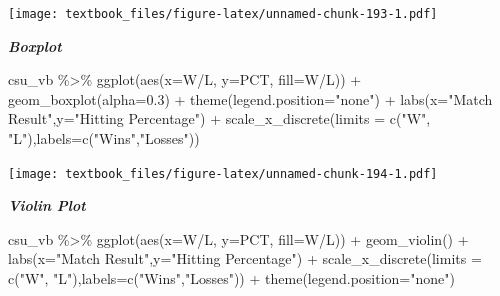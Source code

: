 \documentclass[
  11pt,
]{book}
\newenvironment{Shaded}{\begin{snugshade}}{\end{snugshade}}
\newcommand{\AttributeTok}[1]{\textcolor[rgb]{0.77,0.63,0.00}{#1}}
\newcommand{\FloatTok}[1]{\textcolor[rgb]{0.00,0.00,0.81}{#1}}
\newcommand{\FunctionTok}[1]{\textcolor[rgb]{0.00,0.00,0.00}{#1}}
\newcommand{\NormalTok}[1]{#1}
\newcommand{\SpecialCharTok}[1]{\textcolor[rgb]{0.00,0.00,0.00}{#1}}
\newcommand{\StringTok}[1]{\textcolor[rgb]{0.31,0.60,0.02}{#1}}
\theoremstyle{definition}
\theoremstyle{definition}
\theoremstyle{definition}
\theoremstyle{definition}
\theoremstyle{remark}
\begin{document}
\texttt{[image: textbook\_files/figure-latex/unnamed-chunk-193-1.pdf]}

\newpage

\textbf{\emph{Boxplot}}

\begin{Shaded}
\begin{Highlighting}[]
\NormalTok{csu\_vb }\SpecialCharTok{\%\textgreater{}\%} 
  \FunctionTok{ggplot}\NormalTok{(}\FunctionTok{aes}\NormalTok{(}\AttributeTok{x=}\StringTok{\textasciigrave{}}\AttributeTok{W/L}\StringTok{\textasciigrave{}}\NormalTok{, }\AttributeTok{y=}\NormalTok{PCT, }\AttributeTok{fill=}\StringTok{\textasciigrave{}}\AttributeTok{W/L}\StringTok{\textasciigrave{}}\NormalTok{)) }\SpecialCharTok{+} 
  \FunctionTok{geom\_boxplot}\NormalTok{(}\AttributeTok{alpha=}\FloatTok{0.3}\NormalTok{) }\SpecialCharTok{+}
  \FunctionTok{theme}\NormalTok{(}\AttributeTok{legend.position=}\StringTok{"none"}\NormalTok{) }\SpecialCharTok{+}
  \FunctionTok{labs}\NormalTok{(}\AttributeTok{x=}\StringTok{"Match Result"}\NormalTok{,}\AttributeTok{y=}\StringTok{"Hitting Percentage"}\NormalTok{) }\SpecialCharTok{+}
  \FunctionTok{scale\_x\_discrete}\NormalTok{(}\AttributeTok{limits =} \FunctionTok{c}\NormalTok{(}\StringTok{"W"}\NormalTok{, }\StringTok{"L"}\NormalTok{),}\AttributeTok{labels=}\FunctionTok{c}\NormalTok{(}\StringTok{"Wins"}\NormalTok{,}\StringTok{"Losses"}\NormalTok{))}
\end{Highlighting}
\end{Shaded}

\texttt{[image: textbook\_files/figure-latex/unnamed-chunk-194-1.pdf]}

\newpage

\textbf{\emph{Violin Plot}}

\begin{Shaded}
\begin{Highlighting}[]
\NormalTok{csu\_vb }\SpecialCharTok{\%\textgreater{}\%} \FunctionTok{ggplot}\NormalTok{(}\FunctionTok{aes}\NormalTok{(}\AttributeTok{x=}\StringTok{\textasciigrave{}}\AttributeTok{W/L}\StringTok{\textasciigrave{}}\NormalTok{, }\AttributeTok{y=}\NormalTok{PCT, }\AttributeTok{fill=}\StringTok{\textasciigrave{}}\AttributeTok{W/L}\StringTok{\textasciigrave{}}\NormalTok{)) }\SpecialCharTok{+} 
  \FunctionTok{geom\_violin}\NormalTok{() }\SpecialCharTok{+}
  \FunctionTok{labs}\NormalTok{(}\AttributeTok{x=}\StringTok{"Match Result"}\NormalTok{,}\AttributeTok{y=}\StringTok{"Hitting Percentage"}\NormalTok{) }\SpecialCharTok{+}
  \FunctionTok{scale\_x\_discrete}\NormalTok{(}\AttributeTok{limits =} \FunctionTok{c}\NormalTok{(}\StringTok{"W"}\NormalTok{, }\StringTok{"L"}\NormalTok{),}\AttributeTok{labels=}\FunctionTok{c}\NormalTok{(}\StringTok{"Wins"}\NormalTok{,}\StringTok{"Losses"}\NormalTok{)) }\SpecialCharTok{+} 
  \FunctionTok{theme}\NormalTok{(}\AttributeTok{legend.position=}\StringTok{"none"}\NormalTok{)}
\end{Highlighting}
\end{Shaded}
\end{document}

